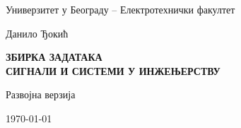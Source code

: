 \begin{center}
\Large

\vfill

Универзитет у Београду -- Електротехнички факултет

\vfill

Данило Ђокић \\

\vfill


\textbf{
    ЗБИРКА ЗАДАТАКА \\
    \Huge СИГНАЛИ И СИСТЕМИ У
    ИНЖЕЊЕРСТВУ \\
} 

\vfill

Развојна верзија\\

\vfill

\today 

\end{center}
